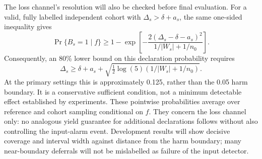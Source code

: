 \documentclass[11pt,a4paper]{article}
\begin{document}
The loss channel's resolution will also be checked before final evaluation.
For a valid, fully labelled independent cohort with
$\Delta_s>\delta+a_s$, the same one-sided inequality gives
\begin{equation}
\Pr\{B_s=1\mid f\}\geq
1-\exp\!\left[-\frac{2(\Delta_s-\delta-a_s)^2}
 {1/|W_s|+1/n_0}\right].
\end{equation}
Consequently, an 80\% lower bound on this declaration probability requires
\begin{equation}
\Delta_s\geq\delta+a_s+
\sqrt{\tfrac12\log(5)(1/|W_s|+1/n_0)}.
\end{equation}
At the primary settings this is approximately 0.125, rather than the
0.05 harm boundary. It is a conservative sufficient condition, not a minimum
detectable effect established by experiments. These pointwise probabilities
average over reference and cohort sampling conditional on $f$.
They concern the loss channel only: no analogous yield guarantee for
additional declarations follows without also controlling the input-alarm
event. Development results will show decisive coverage and interval width
against distance from the harm boundary; many near-boundary deferrals will
not be mislabelled as failure of the input detector.
\end{document}

